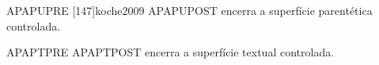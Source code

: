 \documentclass{abntexto-ufc}
\begin{document}
\textual

\noindent APAPUPRE [147]{koche2009} APAPUPOST encerra a superfície parentética controlada.

\noindent APAPTPRE  APAPTPOST encerra a superfície textual controlada.
\end{document}
